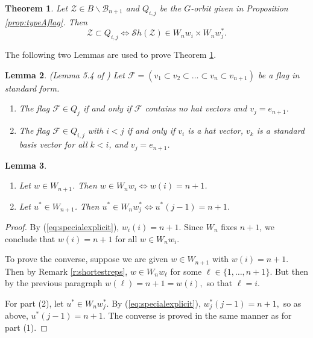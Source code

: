 \documentclass[12pt]{amsart}
\numberwithin{equation}{section}
\newtheorem{thm}{Theorem}[section]
\newtheorem{lem}[thm]{Lemma}
\newcommand{\cZ}{{\mathcal Z}}
\newcommand{\Wn}{{W}_n}
\newcommand{\cW}{{ W}}
\newcommand{\B}{\mathcal{B}}
\newcommand{\F}{\mathcal{F}}
\newcommand{\Sh}{\mathcal{S}h}
\begin{document}
\begin{thm}\label{thm:ShandKorbits}
Let $\cZ\in B\backslash\B_{n+1}$ and $Q_{i,j}$ be the $G$-orbit given in Proposition \ref{prop:typeAflag}.   Then 
\begin{equation}\label{eq:ShandK}
\cZ\subset Q_{i,j}\Leftrightarrow \Sh(\cZ)\in \Wn w_{i}\times \Wn w_{j}^{*}.
\end{equation}
\end{thm}
\noindent The following two Lemmas are used to prove Theorem \ref{thm:ShandKorbits}.
\begin{lem}\label{l:oldlemma}(Lemma 5.4 of \cite{CE21II})
Let $\F=(v_{1}\subset v_{2}\subset\dots\subset v_{n}\subset v_{n+1})$ be a flag in standard form.  
\begin{enumerate}
\item The flag $\F\in Q_{j}$ if and only if $\F$ contains no hat vectors and $v_{j}=e_{n+1}$. 
\item  The flag $\F\in Q_{i,j}$ with $i<j$ if and only if $v_{i}$ is a hat vector, 
$v_{k}$ is a standard basis vector for all $k<i$, and $v_{j}=e_{n+1}$.  
\end{enumerate}
\end{lem}
\begin{lem}\label{l:cosets}
\begin{enumerate}
\item Let $w\in {\cW}_{n+1}$.  Then $w\in \Wn w_{i}\Leftrightarrow w(i)=n+1$.  
\item Let $u^{*}\in {\cW}_{n+1}$.  Then $u^{*}\in \Wn w_{j}^{*}\Leftrightarrow u^{*}(j-1)=n+1$.  
\end{enumerate}
\end{lem}
\begin{proof}
 By (\ref{eq:specialexplicit}), $w_{i}(i)=n+1$.  Since $\Wn$ fixes $n+1$, we conclude that $w(i)=n+1$ for all $w\in {\cW}_{n} w_{i}$.

To prove the converse,  suppose we are given $w\in {\cW}_{n+1}$ with $w(i)=n+1$.  Then by Remark \ref{r:shortestreps}, $w\in \Wn w_{\ell}$ for some $\ell\in\{1,\dots, n+1\}$.  But then by the previous paragraph $w(\ell)=n+1=w(i),$  so that $\ell=i$.  


For part (2), let $u^{*}\in \Wn w_{j}^{*}$.   By (\ref{eq:specialexplicit}),  $w_{j}^{*}(j-1)=n+1,$ so as above, $u^{*}(j-1)=n+1.$  The converse is proved in the same manner as for part (1).

\end{proof}
\end{document}
